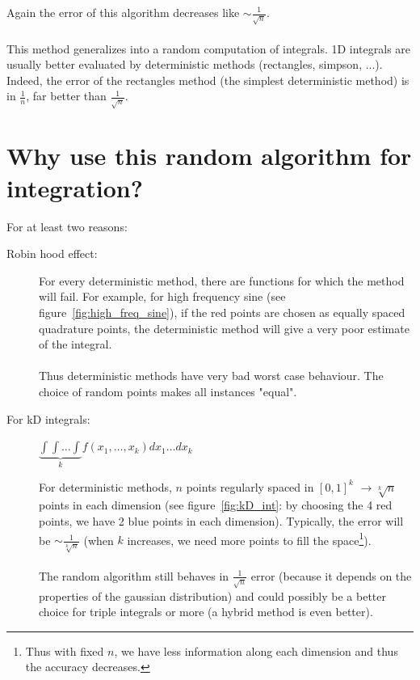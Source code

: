 \documentclass[11pt,a4paper]{scrartcl} %
\theoremstyle{definition}
\begin{document}
Again the error of this algorithm decreases like $\sim \frac{1}{\sqrt{n}}$.

\paragraph{}

This method generalizes into a random computation of integrals. 1D integrals are usually better evaluated by deterministic methods (rectangles, simpson, ...). Indeed, the error of the rectangles method (the simplest deterministic method) is in $\frac{1}{n}$, far better than $\frac{1}{\sqrt{n}}$.

\section{Why use this random algorithm for integration?}
For at least two reasons:
\begin{description}
\item[Robin hood effect: ] For every deterministic method, there are functions for which the method will fail. For example, for high frequency sine (see figure~\ref{fig:high_freq_sine}), if the red points are chosen as equally spaced quadrature points, the deterministic method will give a very poor estimate of the integral.
\paragraph{}
Thus deterministic methods have very bad worst case behaviour. The choice of random points makes all instances "equal".
\item[For kD integrals: ] $\underbrace{\int \int \hdots \int}_{k} f(x_1,\hdots,x_k)dx_1\hdots dx_{k}$

For deterministic methods, $n$ points regularly spaced in $[0,1]^k$ $\rightarrow \sqrt[k]{n}$ points in each dimension (see figure~\ref{fig:kD_int}: by choosing the 4 red points, we have 2 blue points in each dimension). Typically, the error will be $\sim \frac{1}{\sqrt[k]{n}}$ (when $k$ increases, we need more points to fill the space\footnote{Thus with fixed $n$, we have less information along each dimension and thus the accuracy decreases.}).

\paragraph{}
The random algorithm still behaves in $\frac{1}{\sqrt{n}}$ error (because it depends on the properties of the gaussian distribution) and could possibly be a better choice for triple integrals or more (a hybrid method is even better).
\end{description}
\end{document}
